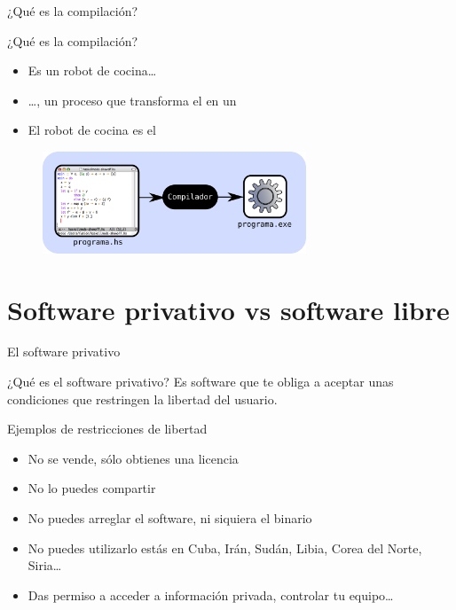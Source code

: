 \documentclass{beamer}
\begin{document}
\begin{frame}{¿Qué es la compilación?}

  \begin{block}{¿Qué es la compilación?}
    \begin{itemize}
    \item Es un robot de cocina\ldots
    \item \ldots, un proceso que transforma el  en un       
    \item El robot de cocina es el 
    \end{itemize}
  \end{block}

  \begin{figure}
    \centering
    \includegraphics[width=0.7\textwidth]{pics/compilacion.png}
  \end{figure}

\end{frame}

\section{Software privativo vs software libre}

\begin{frame}{El software privativo}

  \begin{block}{¿Qué es el software privativo?}
    Es software que te obliga a aceptar unas condiciones que restringen la libertad del     usuario.
  \end{block}
  \pause
  \begin{alertblock}{Ejemplos de restricciones de libertad}
    \begin{itemize}
    \item No se vende, sólo obtienes una licencia
    \item No lo puedes compartir
    \item No puedes arreglar el software, ni siquiera el binario
    \item No puedes utilizarlo estás en Cuba, Irán, Sudán, Libia,             Corea del Norte,       Siria\ldots
    \item Das permiso a acceder a información privada, controlar tu             equipo\ldots
    \end{itemize}
    
  \end{alertblock}
\end{frame}
\end{document}
